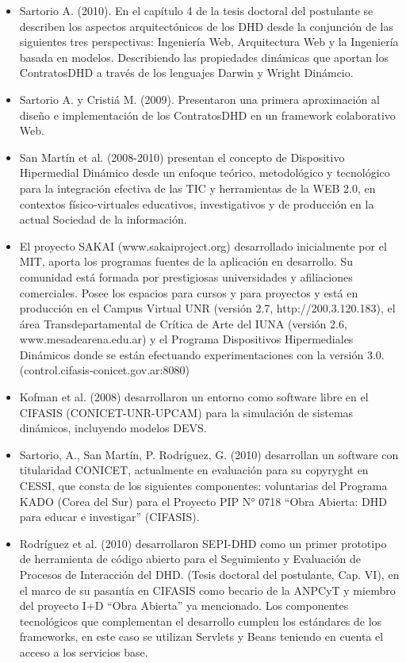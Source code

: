 \begin{itemize}

\item
Sartorio A. (2010).  En el capítulo 4 de la tesis doctoral del postulante
se describen los aspectos arquitectónicos de los DHD desde la conjunción de las
siguientes tres perspectivas: Ingeniería Web, Arquitectura Web y la Ingeniería
basada en modelos.  Describiendo las propiedades dinámicas que aportan los
ContratosDHD a través de los lenguajes Darwin y Wright Dinámcio.


\item
Sartorio A. y Cristiá M.  (2009). Presentaron una primera aproximación al
diseño e implementación de los ContratosDHD en un framework colaborativo Web. 

\item
San Martín et al. (2008-2010) presentan el concepto de Dispositivo Hipermedial
Dinámico desde un enfoque teórico, metodológico y tecnológico para la
integración efectiva de las TIC y herramientas de la WEB 2.0, en contextos
físico-virtuales educativos, investigativos y de producción en la actual
Sociedad de la información. 


\item
El proyecto SAKAI (www.sakaiproject.org) desarrollado inicialmente por el
MIT, aporta los programas fuentes de la aplicación en desarrollo. Su comunidad
está formada por prestigiosas universidades y afiliaciones comerciales. Posee
los espacios para cursos y para proyectos y está en producción en el Campus
Virtual UNR (versión 2.7, http://200.3.120.183), el área Transdepartamental de
Crítica de Arte del IUNA (versión 2.6, www.mesadearena.edu.ar) y el Programa
Dispositivos Hipermediales Dinámicos donde se están efectuando experimentaciones
con la versión 3.0. (control.cifasis-conicet.gov.ar:8080)

\item
Kofman et al. (2008) desarrollaron un entorno como software libre en el
CIFASIS (CONICET-UNR-UPCAM) para la simulación de sistemas dinámicos, incluyendo
modelos DEVS. 

\item
Sartorio, A., San Martín, P. Rodríguez, G. (2010) desarrollan un software
con titularidad CONICET, actualmente en evaluación para su copyryght en CESSI,
que consta de los siguientes componentes:
voluntarias del Programa KADO (Corea del Sur) para el Proyecto PIP N° 0718 “Obra
Abierta: DHD para educar e investigar” (CIFASIS).

\item
Rodríguez et al. (2010) desarrollaron SEPI-DHD como un primer prototipo de
herramienta de código abierto para el Seguimiento y Evaluación de Procesos de
Interacción del DHD. (Tesis doctoral del postulante, Cap. VI), en el marco de su
pasantía en CIFASIS como becario de la ANPCyT y miembro del proyecto I+D “Obra
Abierta” ya mencionado. Los componentes tecnológicos que complementan el
desarrollo cumplen los estándares de los frameworks, en este caso se utilizan
Servlets y Beans teniendo en cuenta el acceso a los servicios base.



\end{itemize}

